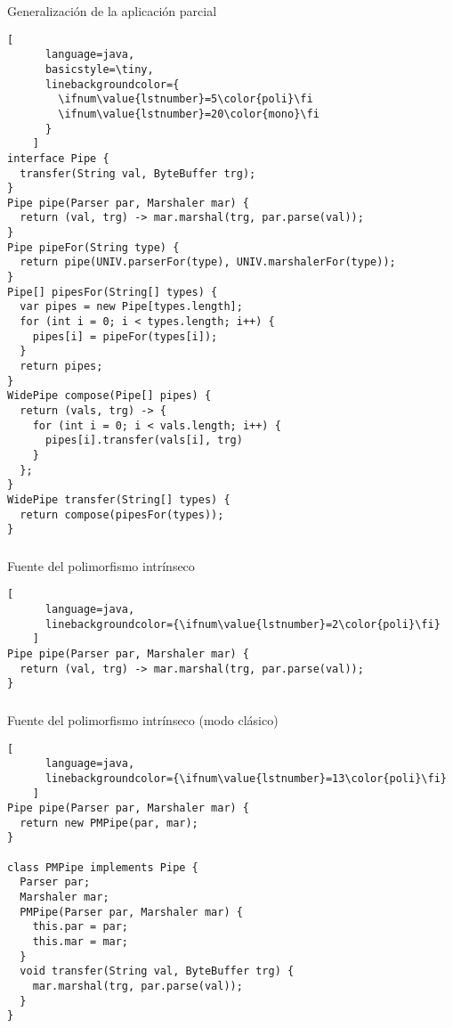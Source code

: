 \begin{frame}[fragile]
  \begin{block}{Generalización de la aplicación parcial}
    \begin{lstlisting}[
      language=java,
      basicstyle=\tiny,
      linebackgroundcolor={
        \ifnum\value{lstnumber}=5\color{poli}\fi
        \ifnum\value{lstnumber}=20\color{mono}\fi
      }
    ]
interface Pipe {
  transfer(String val, ByteBuffer trg);
}
Pipe pipe(Parser par, Marshaler mar) {
  return (val, trg) -> mar.marshal(trg, par.parse(val));
}
Pipe pipeFor(String type) {
  return pipe(UNIV.parserFor(type), UNIV.marshalerFor(type));
}
Pipe[] pipesFor(String[] types) {
  var pipes = new Pipe[types.length];
  for (int i = 0; i < types.length; i++) {
    pipes[i] = pipeFor(types[i]);
  }
  return pipes;
}
WidePipe compose(Pipe[] pipes) {
  return (vals, trg) -> {
    for (int i = 0; i < vals.length; i++) {
      pipes[i].transfer(vals[i], trg)
    }
  };
}
WidePipe transfer(String[] types) {
  return compose(pipesFor(types));
}
    \end{lstlisting}
  \end{block}
\end{frame}


\begin{frame}[fragile]
  \frametitle{\ft}
  \begin{block}{Fuente del polimorfismo intrínseco}
    \begin{lstlisting}[
      language=java,
      linebackgroundcolor={\ifnum\value{lstnumber}=2\color{poli}\fi}
    ]
Pipe pipe(Parser par, Marshaler mar) {
  return (val, trg) -> mar.marshal(trg, par.parse(val));
}
    \end{lstlisting}
  \end{block}
\end{frame}


\begin{frame}[fragile]
  \frametitle{\ft}
  \begin{block}{Fuente del polimorfismo intrínseco (modo clásico)}
    \begin{lstlisting}[
      language=java,
      linebackgroundcolor={\ifnum\value{lstnumber}=13\color{poli}\fi}
    ]
Pipe pipe(Parser par, Marshaler mar) {
  return new PMPipe(par, mar);
}

class PMPipe implements Pipe {
  Parser par;
  Marshaler mar;
  PMPipe(Parser par, Marshaler mar) {
    this.par = par;
    this.mar = mar;
  }
  void transfer(String val, ByteBuffer trg) {
    mar.marshal(trg, par.parse(val));
  }
}
    \end{lstlisting}
  \end{block}
\end{frame}



